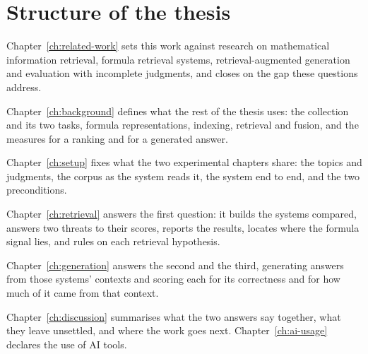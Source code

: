 \section{Structure of the thesis}\label{sec:intro-structure}

Chapter~\ref{ch:related-work} sets this work against research on mathematical information
retrieval, formula retrieval systems, retrieval-augmented generation and evaluation with incomplete
judgments, and closes on the gap these questions address.

Chapter~\ref{ch:background} defines what the rest of the thesis uses: the collection and its two
tasks, formula representations, indexing, retrieval and fusion, and the measures for a ranking and
for a generated answer.

Chapter~\ref{ch:setup} fixes what the two experimental chapters share: the topics and judgments,
the corpus as the system reads it, the system end to end, and the two preconditions.

Chapter~\ref{ch:retrieval} answers the first question: it builds the systems compared, answers two
threats to their scores, reports the results, locates where the formula signal lies, and rules on
each retrieval hypothesis.

Chapter~\ref{ch:generation} answers the second and the third, generating answers from those
systems' contexts and scoring each for its correctness and for how much of it came from that
context.

Chapter~\ref{ch:discussion} summarises what the two answers say together, what they leave
unsettled, and where the work goes next. Chapter~\ref{ch:ai-usage} declares the use of AI tools.
